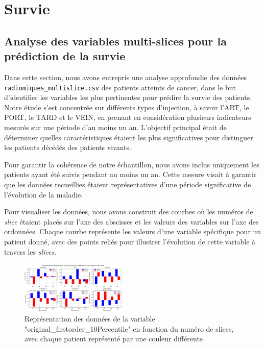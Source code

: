 \chapter{Survie}
\label{ch:ch5}

\section{Analyse des variables multi-slices pour la prédiction de la survie}



Dans cette section, nous avons entrepris une analyse approfondie des données \texttt{radiomiques\_multislice.csv} des patients atteints de cancer, dans le but d'identifier les variables les plus pertinentes pour prédire la survie des patients. Notre étude s'est concentrée sur différents types d'injection, à savoir l'ART, le PORT, le TARD et le VEIN, en prenant en considération plusieurs indicateurs mesurés sur une période d'au moins un an. L'objectif principal était de déterminer quelles caractéristiques étaient les plus significatives pour distinguer les patients décédés des patients vivants.

Pour garantir la cohérence de notre échantillon, nous avons inclus uniquement les patients ayant été suivis pendant au moins un an. Cette mesure visait à garantir que les données recueillies étaient représentatives d'une période significative de l'évolution de la maladie.

Pour visualiser les données, nous avons construit des courbes où les numéros de \textit{slice} étaient placés sur l'axe des abscisses et les valeurs des variables sur l'axe des ordonnées. Chaque courbe représente les valeurs d'une variable spécifique pour un patient donné, avec des points reliés pour illustrer l'évolution de cette variable à travers les \textit{slices}.

\begin{figure}[H]
    \centering
    \includegraphics[width=0.45\textwidth]{img/Figure_11.png}
    \caption{Représentation des données de la variable "original\_firstorder\_10Percentile" en fonction du numéro de slices, avec chaque patient représenté par une couleur différente}
\end{figure}


